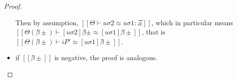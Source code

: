 \begin{proof}
\begin{itemize}
            Then by assumption, $[[Θ ⊢ uσ2 ≈ uσ1 : Ξ]]$,
            which in particular means $[[Θ(β̂±) ⊢ [uσ2]β̂± ≈ [uσ1]β̂±]]$,
            that is $[[Θ(β̂±) ⊢ iP' ≈ [uσ1]β̂±]]$.
        \item if $[[β̂±]]$ is negative, the proof is analogous.
    \end{itemize}
\end{proof}